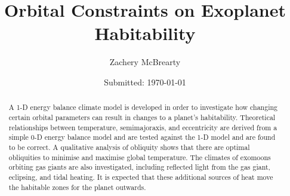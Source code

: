 \documentclass[12pt, onecolumn]{revtex4-2}    %
\begin{document}
\title{Orbital Constraints on Exoplanet Habitability}
\date{Submitted: \today{}}
\author{Zachery McBrearty}

\begin{abstract}

  A 1-D energy balance climate model is developed in order to investigate how changing certain orbital parameters can result in changes to a planet's habitability.
  Theoretical relationships between temperature, semimajoraxis, and eccentricity are derived from a simple 0-D energy balance model and are tested against the 1-D model and are found to be correct.
  A qualitative analysis of obliquity shows that there are optimal obliquities to minimise and maximise global temperature.
  The climates of exomoons orbiting gas giants are also investigated, including reflected light from the gas giant, eclipsing, and tidal heating.
  It is expected that these additional sources of heat move the habitable zones for the planet outwards.

\end{abstract}


\maketitle

\tableofcontents

\newpage
\end{document}

